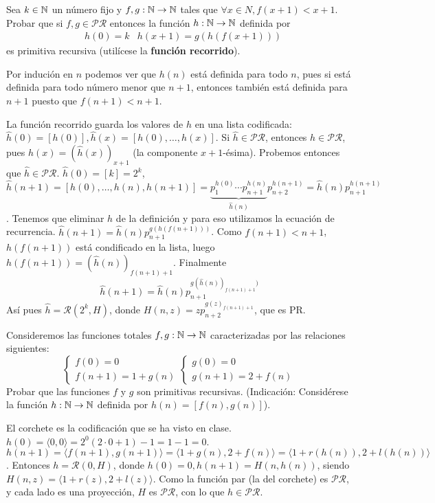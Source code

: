 \documentclass[twoside]{article}
\newcommand{\PR}{\mathcal{PR}}
\begin{document}
\newpage

\begin{ejercicio}{12}
Sea $k \in \mathbb{N}$ un número fijo y $f, g : \mathbb{N} \to \mathbb{N}$ tales que $\forall x \in N, f(x + 1) < x + 1$.
Probar que si $f, g \in \mathcal{PR}$ entonces la función $h : \mathbb{N} \to \mathbb{N}$ definida por
\begin{align*}
&h(0) = k
&h(x + 1) = g(h(f(x + 1)))
\end{align*}
es primitiva recursiva (utilícese la \textbf{función recorrido}).
\end{ejercicio}
\begin{solucion}
Por indución en $n$ podemos ver que $h(n)$ está definida para todo $n$, pues si está definida para todo número menor que $n+1$, entonces también está definida para $n+1$ puesto que $f(n+1)<n+1$. 

La función recorrido guarda los valores de $h$ en una lista codificada: $\hat{h}(0)=[h(0)],\hat{h}(x)=[h(0),\dots,h(x)]$. Si $\hat{h}\in\mathcal{PR}$, entonces $h\in\mathcal{PR}$, pues $h(x)=(\hat{h}(x))_{x+1}$ (la componente $x+1$-ésima). Probemos entonces que $\hat{h}\in\mathcal{PR}$. $\hat{h}(0)=[k]=2^k$, $\hat{h}(n+1)=[h(0),\dots,h(n),h(n+1)]=\underbrace{p_1^{h(0)}\cdots p_{n+1}^{h(n)}}_{\hat{h}(n)}p_{n+2}^{h(n+1)}=\hat{h}(n)p_{n+1}^{h(n+1)}$. Tenemos que eliminar $h$ de la definición y para eso utilizamos la ecuación de recurrencia. $\hat{h}(n+1)=\hat{h}(n)p_{n+1}^{g(h(f(n+1)))}$. Como $f(n+1)<n+1$, $h(f(n+1))$ está condificado en la lista, luego $h(f(n+1))=(\hat{h}(n))_{f(n+1)+1}$. Finalmente
$$\hat{h}(n+1)=\hat{h}(n)p_{n+1}^{g(\hat{h}(n))_{f(n+1)+1})}$$
Así pues $\hat{h}=\mathcal{R}(2^k, H)$, donde $H(n,z)=zp_{n+2}^{g(z)_{f(n+1)+1}}$, que es PR. 
\end{solucion}

\newpage

\begin{ejercicio}{14}
Consideremos las funciones totales $f, g : \mathbb{N} \to \mathbb{N}$ caracterizadas por las relaciones
siguientes:
\[
\begin{cases}
f(0) = 0\\
f(n + 1) = 1 + g(n)
\end{cases}\begin{cases}
g(0) = 0\\
g(n + 1) = 2 + f(n)
\end{cases}
\]
Probar que las funciones $f$ y $g$ son primitivas recursivas. (Indicación: Considérese la función
$h : \mathbb{N} \to \mathbb{N}$ definida por $h(n) = [f(n), g(n)]$).
\end{ejercicio}
\begin{solucion}
El corchete es la codificación que se ha visto en clase. $h(0)=\langle 0,0\rangle =2^0(2\cdot 0+1)-1=1-1=0$. $h(n+1)=\langle f(n+1),g(n+1)\rangle=\langle 1+g(n),2+f(n)\rangle=\langle 1+r(h(n)),2+l(h(n))\rangle$. Entonces $h=\mathcal{R}(0,H)$, donde $h(0)=0, h(n+1)=H(n,h(n))$, siendo $H(n,z)=\langle 1+r(z),2+l(z)\rangle$. Como la función par (la del corchete) es $\PR$, y cada lado es una proyección, $H$ es $\PR$, con lo que $h\in\mathcal{PR}$.
\end{solucion}
\end{document}
